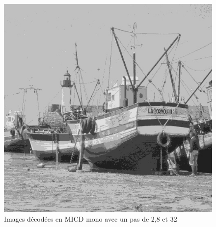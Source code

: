 \documentclass[12pt]{report}
\begin{document}
\begin{figure}[H]
\begin{center}
\includegraphics[scale=0.25]{../ImageRes/ImagedecodeeMICDmonoQ32.jpg} 
\caption{Images décodées en MICD mono avec un pas de 2,8 et 32 }
\end{center}
\end{figure}
\end{document}
